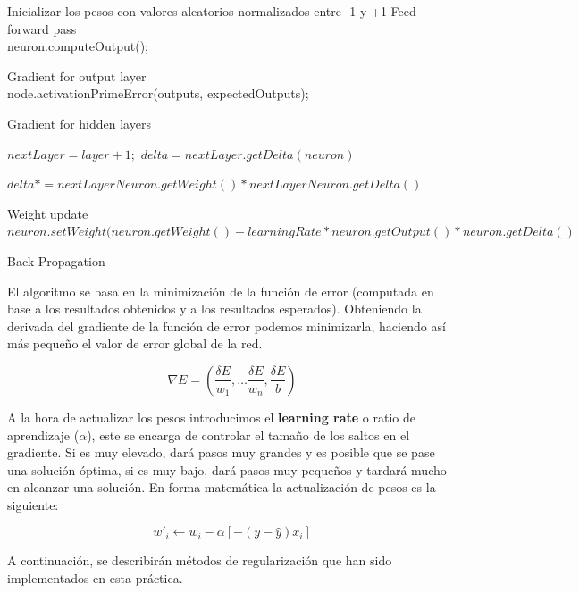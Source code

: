 \begin{algorithm}[H]
    Inicializar los pesos con valores aleatorios normalizados entre -1 y +1
    Feed forward pass\\
    {
        {
            neuron.computeOutput();
        }
	}
	
	Gradient for output layer\\
	{
	    node.activationPrimeError(outputs, expectedOutputs);
	}
	
	Gradient for hidden layers
	{
	    {   
	        $nextLayer = layer + 1;$
	        $delta = nextLayer.getDelta(neuron)$
	        
	        {
	            $delta *= nextLayerNeuron.getWeight() * nextLayerNeuron.getDelta()$
	        }
	    }
	}
	
	Weight update\\
    {
        {
            $neuron.setWeight(neuron.getWeight() - learningRate * neuron.getOutput() * neuron.getDelta()$
        }
    }
	    
	\caption{Back Propagation}
	\label{alg:backprop}
\end{algorithm}

El algoritmo se basa en la minimización de la función de error (computada en base a los resultados obtenidos y a los resultados esperados). Obteniendo la derivada del gradiente de la función de error podemos minimizarla, haciendo así más pequeño el valor de error global de la red.

\[
    \nabla E = \left( \dfrac{\delta E}{w_1}, \dots  \dfrac{\delta E}{w_n}, \dfrac{\delta E}{b} \right)
\]

A la hora de actualizar los pesos introducimos el \textbf{learning rate} o ratio de aprendizaje ($\alpha$), este se encarga de controlar el tamaño de los saltos en el gradiente. Si es muy elevado, dará pasos muy grandes y es posible que se pase una solución óptima, si es muy bajo, dará pasos muy pequeños y tardará mucho en alcanzar una solución. En forma matemática la actualización de pesos es la siguiente:

\[
    w\prime_i \longleftarrow w_i - \alpha[-(y - \hat{y}) x_i]
\]

A continuación, se describirán métodos de regularización que han sido implementados en esta práctica.

